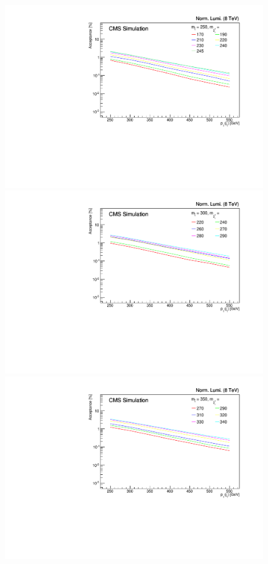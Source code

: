 \begin{figure}[ht!]
\begin{center}
  \includegraphics[scale=0.35]{Figures/sus13009/limitplots/plots/stop/acceptance_250.pdf}
  \includegraphics[scale=0.35]{Figures/sus13009/limitplots/plots/stop/acceptance_300.pdf} 
  \includegraphics[scale=0.35]{Figures/sus13009/limitplots/plots/stop/acceptance_350.pdf}   
   

\end{center}
\end{figure}
